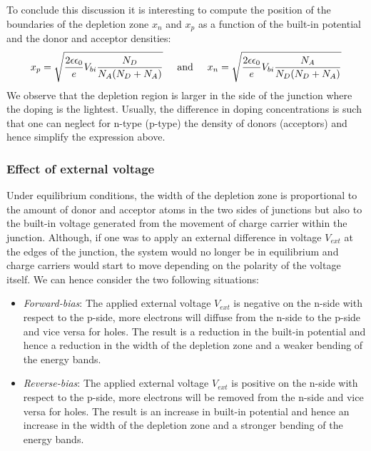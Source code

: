 		To conclude this discussion it is interesting to compute the position of the boundaries of the depletion zone $x_n$ and $x_p$ as a function of the built-in potential and the donor and acceptor densities: 
		\begin{equation}
			x_p = \sqrt{\frac{2 \epsilon \epsilon_0}{e} V_{bi} \frac{N_D}{N_A(N_D + N_A)}} \hspace{5mm} \text{and} \hspace{5mm} x_n = \sqrt{\frac{2 \epsilon \epsilon_0}{e} V_{bi} \frac{N_A}{N_D(N_D + N_A)}}
		\end{equation}
		We observe that the depletion region is larger in the side of the junction where the doping is the lightest. Usually, the difference in doping concentrations is such that one can neglect for n-type (p-type) the density of donors (acceptors) and hence simplify the expression above. 

		\subsubsection{Effect of external voltage}
		
		Under equilibrium conditions, the width of the depletion zone is proportional to the amount of donor and acceptor atoms in the two sides of junctions but also to the built-in voltage generated from the movement of charge carrier within the junction. Although, if one was to apply an external difference in voltage $V_{ext}$ at the edges of the junction, the system would no longer be in equilibrium and charge carriers would start to move depending on the polarity of the voltage itself. We can hence consider the two following situations: 
		\begin{itemize}
			\item \textit{Forward-bias}: The applied external voltage $V_{ext}$ is negative on the n-side with respect to the p-side, more electrons will diffuse from the n-side to the p-side and vice versa for holes. The result is a reduction in the built-in potential and hence a reduction in the width of the depletion zone and a weaker bending of the energy bands. 
			\item \textit{Reverse-bias}: The applied external voltage $V_{ext}$ is positive on the n-side with respect to the p-side, more electrons will be removed from the n-side and vice versa for holes. The result is an increase in built-in potential and hence an increase in the width of the depletion zone and a stronger bending of the energy bands. 
		\end{itemize} 

